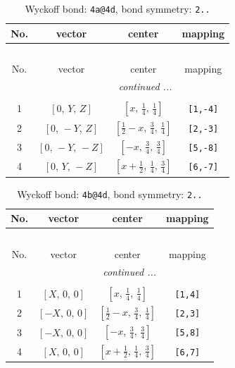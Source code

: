 \documentclass[fleqn,8pt]{jsarticle}
\begin{document}
\begin{longtable}{cccc}
\caption{Wyckoff bond: {\tt 4a@4d}, bond symmetry: {\tt 2..}}
 \\
 \hline \hline
No. & vector & center & mapping \\ \hline \endfirsthead

\multicolumn{3}{l}{\tablename\ \thetable{}} \\
 \hline \hline
No. & vector & center & mapping \\ \hline \endhead

 \hline \hline
\multicolumn{3}{r}{\footnotesize\it continued ...} \\ \endfoot

 \hline \hline
\multicolumn{3}{r}{} \\ \endlastfoot

1 & $\left[ 0,\, Y,\, Z \right]$ & $\left[ x,\, \frac{1}{4},\, \frac{1}{4} \right]$ & {\tt [1,-4]} \\ \hline
2 & $\left[ 0,\, - Y,\, Z \right]$ & $\left[ \frac{1}{2} - x,\, \frac{3}{4},\, \frac{1}{4} \right]$ & {\tt [2,-3]} \\ \hline
3 & $\left[ 0,\, - Y,\, - Z \right]$ & $\left[ - x,\, \frac{3}{4},\, \frac{3}{4} \right]$ & {\tt [5,-8]} \\ \hline
4 & $\left[ 0,\, Y,\, - Z \right]$ & $\left[ x + \frac{1}{2},\, \frac{1}{4},\, \frac{3}{4} \right]$ & {\tt [6,-7]} \\
\end{longtable}
\renewcommand{\arraystretch}{1.2}
\begin{longtable}{cccc}
\caption{Wyckoff bond: {\tt 4b@4d}, bond symmetry: {\tt 2..}}
 \\
 \hline \hline
No. & vector & center & mapping \\ \hline \endfirsthead

\multicolumn{3}{l}{\tablename\ \thetable{}} \\
 \hline \hline
No. & vector & center & mapping \\ \hline \endhead

 \hline \hline
\multicolumn{3}{r}{\footnotesize\it continued ...} \\ \endfoot

 \hline \hline
\multicolumn{3}{r}{} \\ \endlastfoot

1 & $\left[ X,\, 0,\, 0 \right]$ & $\left[ x,\, \frac{1}{4},\, \frac{1}{4} \right]$ & {\tt [1,4]} \\ \hline
2 & $\left[ - X,\, 0,\, 0 \right]$ & $\left[ \frac{1}{2} - x,\, \frac{3}{4},\, \frac{1}{4} \right]$ & {\tt [2,3]} \\ \hline
3 & $\left[ - X,\, 0,\, 0 \right]$ & $\left[ - x,\, \frac{3}{4},\, \frac{3}{4} \right]$ & {\tt [5,8]} \\ \hline
4 & $\left[ X,\, 0,\, 0 \right]$ & $\left[ x + \frac{1}{2},\, \frac{1}{4},\, \frac{3}{4} \right]$ & {\tt [6,7]} \\
\end{longtable}
\end{document}
